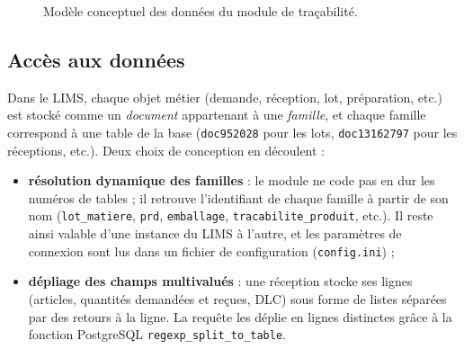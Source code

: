 \begin{figure}[H]
\caption{Modèle conceptuel des données du module de traçabilité.}
\label{fig:modele-donnees}
\end{figure}

\subsection{Accès aux données}

Dans le \ac{LIMS}, chaque objet métier (demande, réception, lot, préparation, etc.) est stocké comme un \emph{document} appartenant à une \emph{famille}, et chaque famille correspond à une table de la base (\texttt{doc952028} pour les lots, \texttt{doc13162797} pour les réceptions, etc.). Deux choix de conception en découlent :
\begin{itemize}
    \item \textbf{résolution dynamique des familles} : le module ne code pas en dur les numéros de tables ; il retrouve l'identifiant de chaque famille à partir de son nom (\texttt{lot\_matiere}, \texttt{prd}, \texttt{emballage}, \texttt{tracabilite\_produit}, etc.). Il reste ainsi valable d'une instance du \ac{LIMS} à l'autre, et les paramètres de connexion sont lus dans un fichier de configuration (\texttt{config.ini}) ;
    \item \textbf{dépliage des champs multivalués} : une réception stocke ses lignes (articles, quantités demandées et reçues, \ac{DLC}) sous forme de listes séparées par des retours à la ligne. La requête les déplie en lignes distinctes grâce à la fonction PostgreSQL \texttt{regexp\_split\_to\_table}.
\end{itemize}

